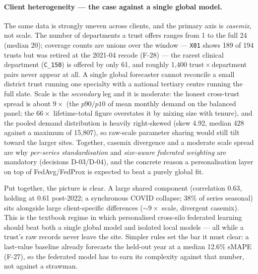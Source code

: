 \documentclass[11pt,a4paper]{article}
\begin{document}
\paragraph{Client heterogeneity --- the case against a single global model.} The same data is strongly uneven across clients, and the primary axis is \emph{casemix}, not scale. The number of departments a trust offers ranges from 1 to the full 24 (median 20); coverage counts are unions over the window --- \texttt{X01} shows 189 of 194 trusts but was retired at the 2021-04 recode (F-28) --- the rarest clinical department (\texttt{C\_150}) is offered by only 61, and roughly 1{,}400 trust\,$\times$\,department pairs never appear at all. A single global forecaster cannot reconcile a small district trust running one specialty with a national tertiary centre running the full slate. Scale is the \emph{secondary} leg and it is moderate: the honest cross-trust spread is about $9\times$ (the $p90/p10$ of mean monthly demand on the balanced panel; the $66\times$ lifetime-total figure overstates it by mixing size with tenure), and the pooled demand distribution is heavily right-skewed (skew 4.92, median 428 against a maximum of 15{,}807), so raw-scale parameter sharing would still tilt toward the larger sites. Together, casemix divergence and a moderate scale spread are why \emph{per-series standardisation} and \emph{size-aware federated weighting} are mandatory (decisions D-03/D-04), and the concrete reason a personalisation layer on top of FedAvg/FedProx is expected to beat a purely global fit.

Put together, the picture is clear. A large shared component (correlation 0.63, holding at 0.61 post-2022; a synchronous COVID collapse; 38\% of series seasonal) sits alongside large client-specific differences ($\sim$$9\times$ scale, divergent casemix). This is the textbook regime in which personalised cross-silo federated learning should beat both a single global model and isolated local models --- all while a trust's raw records never leave the site. Simpler rules set the bar it must clear: a last-value baseline already forecasts the held-out year at a median 12.6\% sMAPE (F-27), so the federated model has to earn its complexity against that number, not against a strawman.
\end{document}
